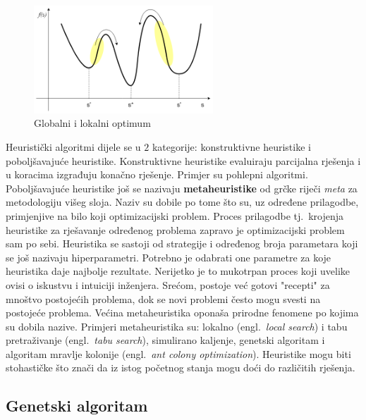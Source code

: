 \documentclass[times, utf8, diplomski]{fer}
\begin{document}
\begin{figure}[htb]
	\centering
	\includegraphics[width=0.6\textwidth]{img/optimum.png}
	\caption{Globalni i lokalni optimum}
	\label{fig:optimum}
\end{figure}

Heuristički algoritmi dijele se u $2$ kategorije: konstruktivne heuristike i poboljšavajuće heuristike. Konstruktivne heuristike evaluiraju parcijalna rješenja i u koracima izgrađuju konačno rješenje. Primjer su pohlepni algoritmi. Poboljšavajuće heuristike još se nazivaju \textbf{metaheuristike} od grčke riječi \textit{meta} za metodologiju višeg sloja. Naziv su dobile po tome što su, uz određene prilagodbe, primjenjive na bilo koji optimizacijski problem. Proces prilagodbe tj.~krojenja heuristike za rješavanje određenog problema zapravo je optimizacijski problem sam po sebi. Heuristika se sastoji od strategije i određenog broja parametara koji se još nazivaju hiperparametri. Potrebno je odabrati one parametre za koje heuristika daje najbolje rezultate. Nerijetko je to mukotrpan proces koji uvelike ovisi o iskustvu i intuiciji inženjera. Srećom, postoje već gotovi "recepti" za mnoštvo postojećih problema, dok se novi problemi često mogu svesti na postojeće problema. Većina metaheuristika oponaša prirodne fenomene po kojima su dobila nazive. Primjeri metaheuristika su: lokalno (engl.~\textit{local search}) i tabu pretraživanje (engl.~\textit{tabu search}), simulirano kaljenje, genetski algoritam i algoritam mravlje kolonije (engl.~\textit{ant colony optimization}). Heuristike mogu biti stohastičke što znači da iz istog početnog stanja mogu doći do različitih rješenja.

\subsection{Genetski algoritam}
\end{document}
